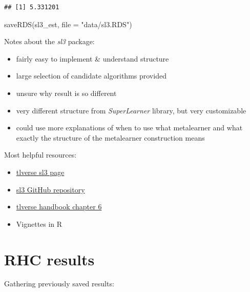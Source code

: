 \documentclass[
]{book}
\newenvironment{Shaded}{\begin{snugshade}}{\end{snugshade}}
\newcommand{\AttributeTok}[1]{\textcolor[rgb]{0.77,0.63,0.00}{#1}}
\newcommand{\FunctionTok}[1]{\textcolor[rgb]{0.00,0.00,0.00}{#1}}
\newcommand{\NormalTok}[1]{#1}
\newcommand{\StringTok}[1]{\textcolor[rgb]{0.31,0.60,0.02}{#1}}
\providecommand{\tightlist}{%
  \setlength{\itemsep}{0pt}\setlength{\parskip}{0pt}}
\begin{document}
\begin{verbatim}
## [1] 5.331201
\end{verbatim}

\begin{Shaded}
\begin{Highlighting}[]
\FunctionTok{saveRDS}\NormalTok{(sl3\_est, }\AttributeTok{file =} \StringTok{"data/sl3.RDS"}\NormalTok{)}
\end{Highlighting}
\end{Shaded}

Notes about the \emph{sl3} package:

\begin{itemize}
\tightlist
\item
  fairly easy to implement \& understand structure
\item
  large selection of candidate algorithms provided
\item
  unsure why result is so different
\item
  very different structure from \emph{SuperLearner} library, but very customizable
\item
  could use more explanations of when to use what metalearner and what exactly the structure of the metalearner construction means
\end{itemize}

Most helpful resources:

\begin{itemize}
\tightlist
\item
  \href{https://tlverse.org/sl3/}{tlverse sl3 page}
\item
  \href{https://github.com/tlverse/sl3/}{sl3 GitHub repository}
\item
  \href{https://tlverse.org/tlverse-handbook/tmle3.html}{tlverse handbook chapter 6}
\item
  Vignettes in R
\end{itemize}

\hypertarget{rhc-results}{%
\section{RHC results}\label{rhc-results}}

Gathering previously saved results:
\end{document}
